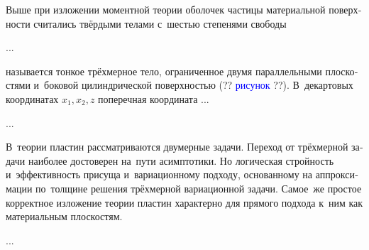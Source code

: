 \begin{otherlanguage}{russian}


\noindent Выше при изложении моментной теории оболочек частицы материальной поверхности считались твёрдыми телами с~шестью степенями свободы

...



\end{otherlanguage}



\label{para:overviewofplates}

\begin{otherlanguage}{russian}

 называется тонкое трёхмерное тело, ограниченное двумя параллельными плоскостями и~боковой цилиндрической поверхностью (?? \textcolor{blue}{рисунок} ??).
В~декартовых координатах ${x_1, x_2, z}$ поперечная координата ...

...

В~теории пластин рассматриваются двумерные задачи.
Переход от трёхмерной задачи наиболее достоверен на~пути асимптотики.
Но логическая стройность и~эффективность присуща и~вариационному подходу, основанному на аппроксимации по~толщине решения трёхмерной вариационной задачи.
Самое~же простое корректное изложение теории пластин характерно для прямого подхода к~ним как материальным плоскостям.

...



\end{otherlanguage}



